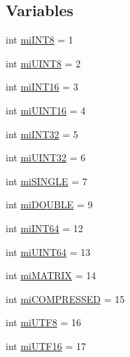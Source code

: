 \subsection*{Variables}
\begin{DoxyCompactItemize}
\item 
int \hyperlink{namespacescipy_1_1io_1_1matlab_1_1mio5__params_ad878a2212deca576aabc02cdf0099cfb}{mi\+I\+N\+T8} = 1
\item 
int \hyperlink{namespacescipy_1_1io_1_1matlab_1_1mio5__params_adecebcbd908e036c75a851332f398317}{mi\+U\+I\+N\+T8} = 2
\item 
int \hyperlink{namespacescipy_1_1io_1_1matlab_1_1mio5__params_ae6accf70898b30277e2f46fcde466457}{mi\+I\+N\+T16} = 3
\item 
int \hyperlink{namespacescipy_1_1io_1_1matlab_1_1mio5__params_adcbd8d51a802790d09b41be384819f80}{mi\+U\+I\+N\+T16} = 4
\item 
int \hyperlink{namespacescipy_1_1io_1_1matlab_1_1mio5__params_a0e1b9ce7882f1299da9a7b9b93bea5ec}{mi\+I\+N\+T32} = 5
\item 
int \hyperlink{namespacescipy_1_1io_1_1matlab_1_1mio5__params_ab3a47094ee4cba416a49570132344ba5}{mi\+U\+I\+N\+T32} = 6
\item 
int \hyperlink{namespacescipy_1_1io_1_1matlab_1_1mio5__params_a573517ae5753454017fa781d1b9ab0b7}{mi\+S\+I\+N\+G\+L\+E} = 7
\item 
int \hyperlink{namespacescipy_1_1io_1_1matlab_1_1mio5__params_a768fea4d5752bcd048bf019fb0dd1ccd}{mi\+D\+O\+U\+B\+L\+E} = 9
\item 
int \hyperlink{namespacescipy_1_1io_1_1matlab_1_1mio5__params_af52a83517deb00f120caa57fa82763f4}{mi\+I\+N\+T64} = 12
\item 
int \hyperlink{namespacescipy_1_1io_1_1matlab_1_1mio5__params_aeb67f04943c99343f12584ecebec8e4d}{mi\+U\+I\+N\+T64} = 13
\item 
int \hyperlink{namespacescipy_1_1io_1_1matlab_1_1mio5__params_a84fd7d9d4cc098be9cc3bfd6d6ed68de}{mi\+M\+A\+T\+R\+I\+X} = 14
\item 
int \hyperlink{namespacescipy_1_1io_1_1matlab_1_1mio5__params_ada6a7915a4b74d9380bf489f032e124a}{mi\+C\+O\+M\+P\+R\+E\+S\+S\+E\+D} = 15
\item 
int \hyperlink{namespacescipy_1_1io_1_1matlab_1_1mio5__params_a2f9d0f74bd62bccee8fc65cd127f7f53}{mi\+U\+T\+F8} = 16
\item 
int \hyperlink{namespacescipy_1_1io_1_1matlab_1_1mio5__params_a0b92b8a3d2289cf9cf15925a4a783357}{mi\+U\+T\+F16} = 17
\item 

\end{DoxyCompactItemize}
